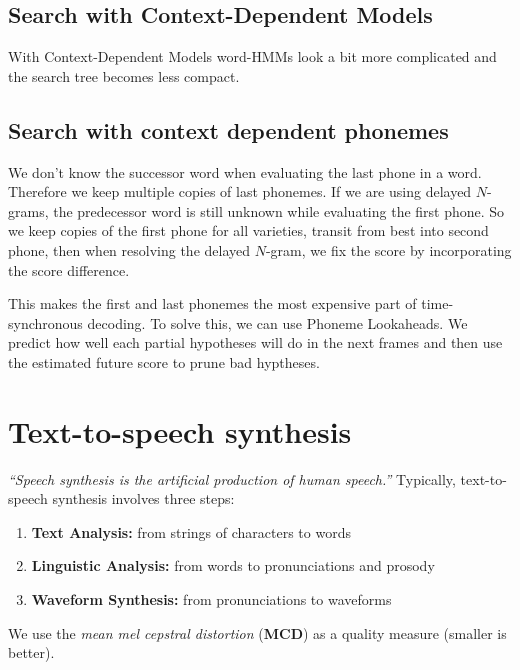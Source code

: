 \subsection{Search with Context-Dependent Models}

With Context-Dependent Models word-HMMs look a bit more complicated and the search tree becomes less compact.

\subsection{Search with context dependent phonemes}
We don't know the successor word when evaluating the last phone in a word. Therefore we keep multiple copies of last phonemes.
If we are using delayed $N$-grams, the predecessor word is still unknown while evaluating the first phone. So we keep copies of the first phone for all varieties, transit from best into second phone, then when resolving the delayed $N$-gram, we fix the score by incorporating the score difference.

This makes the first and last phonemes the most expensive part of time-synchronous decoding.
To solve this, we can use Phoneme Lookaheads. We predict how well each partial hypotheses will do in the next frames and then use the estimated future score to prune bad hyptheses.

\newpage

\section{Text-to-speech synthesis}
\emph{``Speech synthesis is the artificial production of human speech.''}
Typically, text-to-speech synthesis involves three steps:
\begin{enumerate}
    \item \textbf{Text Analysis:} from strings of characters to words
    \item \textbf{Linguistic Analysis:} from words to pronunciations and prosody
    \item \textbf{Waveform Synthesis:} from pronunciations to waveforms
\end{enumerate}

We use the \textit{mean mel cepstral distortion} (\textbf{MCD}) as a quality measure (smaller is better).

